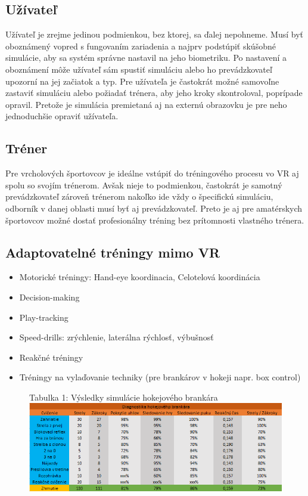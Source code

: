 \documentclass[10pt,twoside,slovak,a4paper]{article}										%
\begin{document}
\subsection {Užívateľ} \label{PR:user}
Užívateľ je zrejme jedinou podmienkou, bez ktorej, sa ďalej nepohneme. Musí byť oboznámený vopred s fungovaním zariadenia a najprv podstúpiť skúšobné simulácie, aby sa systém správne nastavil na jeho biometriku. Po nastavení a oboznámení môže užívateľ sám spustiť simuláciu alebo ho prevádzkovateľ upozorní na jej začiatok a typ. Pre užívateľa je častokrát možné samovoľne zastaviť simuláciu alebo požiadať trénera, aby jeho kroky skontroloval, poprípade opravil. Pretože je simulácia premietaná aj na externú obrazovku je pre neho jednoduchšie opraviť užívateľa.

\subsection {Tréner} \label{PR:trendo}
Pre vrcholových športovcov je ideálne vstúpiť do tréningového procesu vo VR aj spolu so svojím trénerom. Avšak nieje to podmienkou, častokrát je samotný prevádzkovateľ zároveň trénerom nakoľko ide vždy o špecifickú simuláciu, odborník v danej oblasti musí byť aj prevádzkovateľ. Preto je aj pre amatérskych športovcov možné dostať profesionálny tréning bez prítomnosti vlastného trénera.

\subsection{Adaptovatelné tréningy mimo VR} 
\begin{itemize}
\item Motorické tréningy: Hand-eye koordinacia, Celotelová koordinácia	
\item Decision-making
\item Play-tracking
\item Speed-drills: zrýchlenie, laterálna rýchlosť, výbušnosť
\item Reakčné tréningy
\item Tréningy na vylaďovanie techniky (pre brankárov v hokeji napr. box control)
\end{itemize}

\clearpage
\begin{figure}[h]
\centering
Tabulka 1: Výsledky simulácie hokejového brankára~\cite{Hlavny:zdroj}
\includegraphics[scale=0.59]{tabulka.png}
\label{tbl}
\end{figure}
\end{document}
